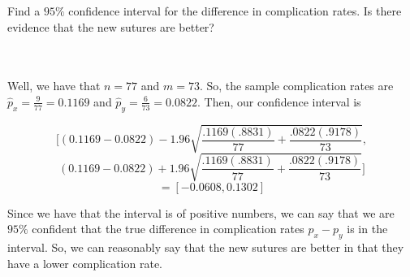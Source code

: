 Find a $95\%$ confidence interval for the difference in complication rates. Is there evidence that the
new sutures are better?\\\\

\begin{solution}\renewcommand{\qedsymbol}{}\ \\
    Well, we have that $n=77$ and $m=73$. So, the sample complication rates are
    $\hat{p}_x=\frac{9}{77}=0.1169$ and $\hat{p}_y=\frac{6}{73}=0.0822$. Then, our confidence interval
    is
    
    $$[(0.1169-0.0822)-1.96\sqrt{\frac{.1169(.8831)}{77}+\frac{.0822(.9178)}{73}},$$
    $$(0.1169-0.0822)+1.96\sqrt{\frac{.1169(.8831)}{77}+\frac{.0822(.9178)}{73}}]$$
    $$=[-0.0608, 0.1302]$$
    
    Since we have that the interval is of positive numbers, we can say that we are $95\%$ confident that
    the true difference in complication rates $p_x-p_y$ is in the interval. So, we can reasonably say
    that the new sutures are better in that they have a lower complication rate.

\end{solution}
